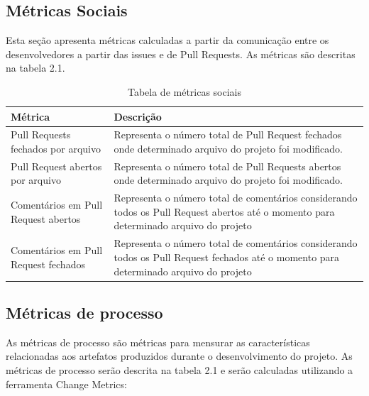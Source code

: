 \subsection{Métricas Sociais}
Esta seção apresenta métricas calculadas a partir da comunicação entre os desenvolvedores a partir das issues e de Pull Requests. As métricas são descritas na tabela 2.1.

\begin{table}[]
\centering
\caption{Tabela de métricas sociais}
\label{metricasociais}
\begin{tabular}{|p{3cm}|p{12cm}|}
\hline
Métrica                                          & Descrição                                                                                                                              \\ \hline
Pull Requests fechados por arquivo               & Representa o número total de Pull Request fechados onde determinado arquivo do projeto foi modificado.                                 \\ \hline
Pull Request abertos por arquivo                 & Representa o número total de Pull Requests abertos onde determinado arquivo do projeto foi modificado.                                 \\ \hline
Comentários em Pull Request abertos  & Representa o número total de comentários considerando todos os Pull Request abertos até o momento para determinado arquivo do projeto  \\ \hline
Comentários em Pull Request fechados & Representa o número total de comentários considerando todos os Pull Request fechados até o momento para determinado arquivo do projeto \\ \hline
\end{tabular}
\end{table}

\subsection{Métricas de processo}
As métricas de processo são métricas para mensurar as características relacionadas aos artefatos produzidos durante o desenvolvimento do projeto. As métricas de processo serão descrita na tabela 2.1 e serão calculadas utilizando a ferramenta Change Metrics:

